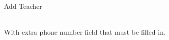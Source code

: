 
\begin{uc}{Add Teacher}

     \\
    With extra phone number field that must be filled in.

\end{uc}
